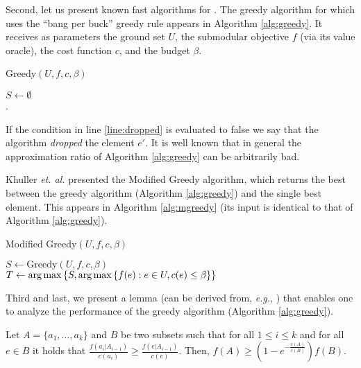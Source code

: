\documentclass[a4paper]{article}
\begin{document}
Second, let us present known fast algorithms for \SK.
The greedy algorithm for \SK which uses the ``bang per buck'' greedy rule appears in Algorithm \ref{alg:greedy}.
It receives as parameters the ground set $U$, the submodular objective $f$ (via its value oracle), the cost function $c$, and the budget $\beta$.

\begin{algorithm}[H]
\caption{Greedy$(U, f, c, \beta)$}
\label{alg:greedy}
$S \leftarrow \emptyset$
\\
.
\end{algorithm}

If the condition in line \ref{line:dropped} is evaluated to false we say that
the algorithm \emph{dropped} the element $e'$.
It is well known that in general the approximation ratio of Algorithm \ref{alg:greedy}
can be arbitrarily bad.

Khuller {\em et. al.} \cite{khuller1999budgeted} presented the Modified Greedy algorithm, which returns the best between the greedy algorithm (Algorithm \ref{alg:greedy}) and the single best element.
This appears in Algorithm \ref{alg:mgreedy} (its input is identical to that of Algorithm \ref{alg:greedy}).

\begin{algorithm}[H]
\caption{Modified Greedy$(U, f, c, \beta)$}
\label{alg:mgreedy}

$S \leftarrow \text{Greedy}(U, f, c, \beta)$
\\
$T \leftarrow \operatorname*{arg\,max}\left\{S, \operatorname*{arg\,max} \left\{f(e):e\in U, c(e)\leq \beta \right\} \right\}$
\\
\end{algorithm}

Third and last, we present a lemma (can be derived from, {\em e.g.}, \cite{khuller1999budgeted}) that enables one to analyze the performance of the greedy algorithm (Algorithm \ref{alg:greedy}).
\begin{lemma}
\label{lemma:sub-main}
Let $A = \{a_1, \dots, a_k\}$ and $B$ be two subsets such that for all $1 \leq i \leq k$
and for all $e \in B$ it holds that
$\frac{f(a_i|A_{i-1})}{c(a_i)} \geq \frac{f(e|A_{i-1})}{c(e)}$.
Then, $f(A) \geq (1 - e^{-\frac{c(A)}{c(B)}})f(B)$.
\end{lemma}
\end{document}
